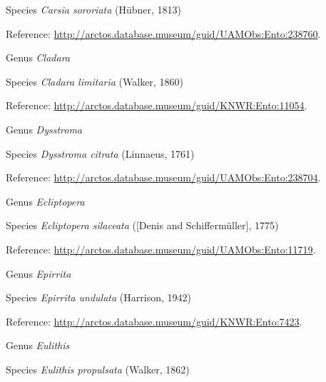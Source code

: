 \documentclass[9pt, article]{memoir}
\begin{document}
\begin{multicols}{2}
\vspace{6pt}\noindent\hspace{36pt}Species \textit{Carsia sororiata} (Hübner, 1813)


Reference: 
\url{http://arctos.database.museum/guid/UAMObs:Ento:238760}.

\vspace{6pt}\noindent\hspace{30pt}Genus \textit{Cladara}


\vspace{6pt}\noindent\hspace{36pt}Species \textit{Cladara limitaria} (Walker, 1860)


Reference: 
\url{http://arctos.database.museum/guid/KNWR:Ento:11054}.

\vspace{6pt}\noindent\hspace{30pt}Genus \textit{Dysstroma}


\vspace{6pt}\noindent\hspace{36pt}Species \textit{Dysstroma citrata} (Linnaeus, 1761)


Reference: 
\url{http://arctos.database.museum/guid/UAMObs:Ento:238704}.

\vspace{6pt}\noindent\hspace{30pt}Genus \textit{Ecliptopera}


\vspace{6pt}\noindent\hspace{36pt}Species \textit{Ecliptopera silaceata} ([Denis and Schiffermüller], 1775)


Reference: 
\url{http://arctos.database.museum/guid/UAMObs:Ento:11719}.

\vspace{6pt}\noindent\hspace{30pt}Genus \textit{Epirrita}


\vspace{6pt}\noindent\hspace{36pt}Species \textit{Epirrita undulata} (Harrison, 1942)


Reference: 
\url{http://arctos.database.museum/guid/KNWR:Ento:7423}.

\vspace{6pt}\noindent\hspace{30pt}Genus \textit{Eulithis}


\vspace{6pt}\noindent\hspace{36pt}Species \textit{Eulithis propulsata} (Walker, 1862)



\end{multicols}
\end{document}
